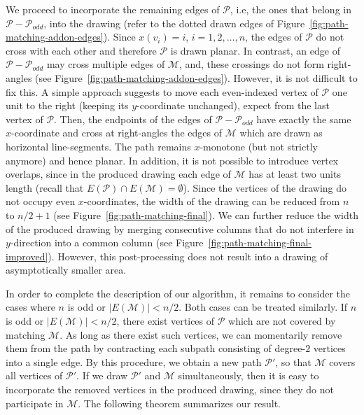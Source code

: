 \documentclass{llncs}
\begin{document}
We proceed to incorporate the remaining edges of $\mathcal{P}$, i.e,
the ones that belong in $\mathcal{P}-\mathcal{P}_{odd}$, into the
drawing (refer to the dotted drawn edges of
Figure~\ref{fig:path-matching-addon-edges}). Since $x(v_i) = i$,
$i=1,2,\ldots,n$, the edges of $\mathcal{P}$ do not cross with each
other and therefore $\mathcal{P}$ is drawn planar. In contrast, an
edge of $\mathcal{P}-\mathcal{P}_{odd}$ may cross multiple edges of
$\mathcal{M}$, and, these crossings do not form right-angles (see
Figure~\ref{fig:path-matching-addon-edges}). However, it is not
difficult to fix this. A simple approach suggests to move each
even-indexed vertex of $\mathcal{P}$ one unit to the right (keeping
its $y$-coordinate unchanged), expect from the last vertex of
$\mathcal{P}$. Then, the endpoints of the edges of
$\mathcal{P}-\mathcal{P}_{odd}$ have exactly the same $x$-coordinate
and cross at right-angles the edges of $\mathcal{M}$ which are drawn
as horizontal line-segments. The path remains $x$-monotone (but not
strictly anymore) and hence planar. In addition, it is not possible
to introduce vertex overlaps, since in the produced drawing each
edge of $\mathcal{M}$ has at least two units length (recall that
$E(\mathcal{P}) \cap E(\mathcal{M}) = \emptyset$). Since the
vertices of the drawing do not occupy even $x$-coordinates, the
width of the drawing can be reduced from $n$ to $n/2+1$ (see
Figure~\ref{fig:path-matching-final}). We can further reduce the
width of the produced drawing by merging consecutive columns that do
not interfere in $y$-direction into a common column (see
Figure~\ref{fig:path-matching-final-improved}). However, this
post-processing does not result into a drawing of asymptotically
smaller area.




In order to complete the description of our algorithm, it remains to
consider the cases where $n$ is odd or $|E(\mathcal{M})|<n/2$. Both
cases can be treated similarly. If $n$ is odd or
$|E(\mathcal{M})|<n/2$, there exist vertices of $\mathcal{P}$ which
are not covered by matching $\mathcal{M}$. As long as there exist
such vertices, we can momentarily remove them from the path by
contracting each subpath consisting of degree-$2$ vertices into a
single edge. By this procedure, we obtain a new path $\mathcal{P}'$,
so that $\mathcal{M}$ covers all vertices of $\mathcal{P}'$. If we
draw $\mathcal{P}'$ and $\mathcal{M}$ simultaneously, then it is
easy to incorporate the removed vertices in the produced drawing,
since they do not participate in $\mathcal{M}$. The following
theorem summarizes our result.
\end{document}
